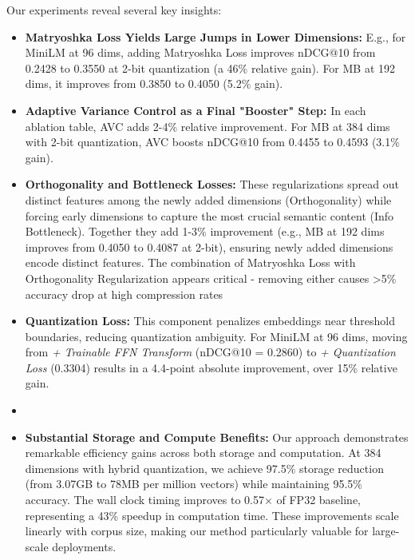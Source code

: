 Our experiments reveal several key insights:
\begin{itemize}
    \item \textbf{Matryoshka Loss Yields Large Jumps in Lower Dimensions:} E.g., for MiniLM at 96 dims, adding Matryoshka Loss improves nDCG@10 from 0.2428 to 0.3550 at 2-bit quantization (a 46\% relative gain). For MB at 192 dims, it improves from 0.3850 to 0.4050 (5.2\% gain).
    \item \textbf{Adaptive Variance Control as a Final "Booster" Step:} In each ablation table, AVC adds 2-4\% relative improvement. For MB at 384 dims with 2-bit quantization, AVC boosts nDCG@10 from 0.4455 to 0.4593 (3.1\% gain).
    \item \textbf{Orthogonality and Bottleneck Losses:} These regularizations spread out distinct features among the newly added dimensions (Orthogonality) while forcing early dimensions to capture the most crucial semantic content (Info Bottleneck). 
    Together they add 1-3\% improvement (e.g., MB at 192 dims improves from 0.4050 to 0.4087 at 2-bit), ensuring newly added dimensions encode distinct features.
    The combination of Matryoshka Loss with Orthogonality Regularization appears critical - removing either causes >5\% accuracy drop at high compression rates
    \item \textbf{Quantization Loss:} This component penalizes embeddings near threshold boundaries, reducing quantization ambiguity. For MiniLM at 96 dims, moving from \textit{+ Trainable FFN Transform} (nDCG@10 = 0.2860) to \textit{+ Quantization Loss} (0.3304) results in a 4.4-point absolute improvement, over 15\% relative gain.
    \item \item \textbf{Substantial Storage and Compute Benefits:} Our approach demonstrates remarkable efficiency gains across both storage and computation. At 384 dimensions with hybrid quantization, we achieve 97.5\% storage reduction (from 3.07GB to 78MB per million vectors) while maintaining 95.5\% accuracy. The wall clock timing improves to 0.57× of FP32 baseline, representing a 43\% speedup in computation time. These improvements scale linearly with corpus size, making our method particularly valuable for large-scale deployments.
    
\end{itemize}

